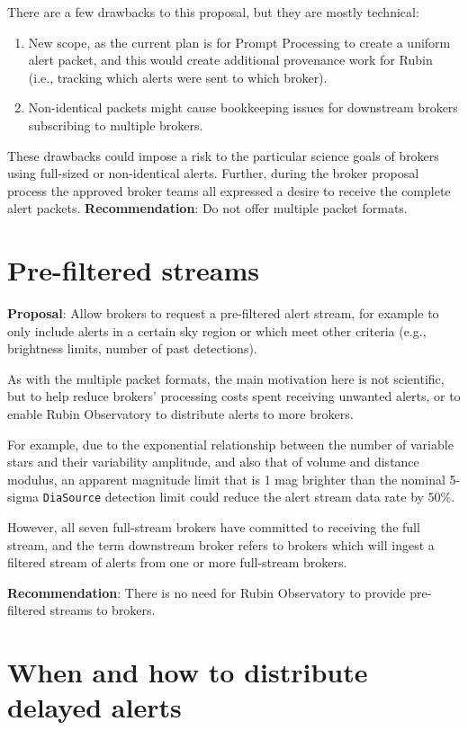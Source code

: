 \documentclass[DM,authoryear,toc]{lsstdoc}
\begin{document}
There are a few drawbacks to this proposal, but they are mostly technical:

\begin{enumerate}
\item New scope, as the current plan is for Prompt Processing to create a uniform alert packet, and this would create additional provenance work for Rubin (i.e., tracking which alerts were sent to which broker).
\item Non-identical packets might cause bookkeeping issues for downstream brokers subscribing to multiple brokers.
\end{enumerate}

These drawbacks could impose a risk to the particular science goals of brokers using full-sized or non-identical alerts.
Further, during the broker proposal process the approved broker teams all expressed a desire to receive the complete alert packets.
\textbf{Recommendation}: Do not offer multiple packet formats.


\section{Pre-filtered streams}\label{sec:prefilter}

\textbf{Proposal}: Allow brokers to request a pre-filtered alert stream, for example to only include alerts in a certain sky 
region or which meet other criteria (e.g., brightness limits, number of past detections).

As with the multiple packet formats, the main motivation here is not scientific, but to help reduce brokers' processing costs 
spent receiving unwanted alerts, or to enable Rubin Observatory to distribute alerts to more brokers.

For example, due to the exponential relationship between the number of variable stars and their variability amplitude, and 
also that of volume and distance modulus, an apparent magnitude limit that is 1 mag brighter than the nominal 5-sigma \texttt{DiaSource} 
detection limit could reduce the alert stream data rate by 50\%.

However, all seven full-stream brokers have committed to receiving the full stream, and the term downstream broker refers to 
brokers which will ingest a filtered stream of alerts from one or more full-stream brokers.

\textbf{Recommendation}: There is no need for Rubin Observatory to provide pre-filtered streams to brokers.


\section{When and how to distribute delayed alerts}\label{sec:delayed}
\end{document}
